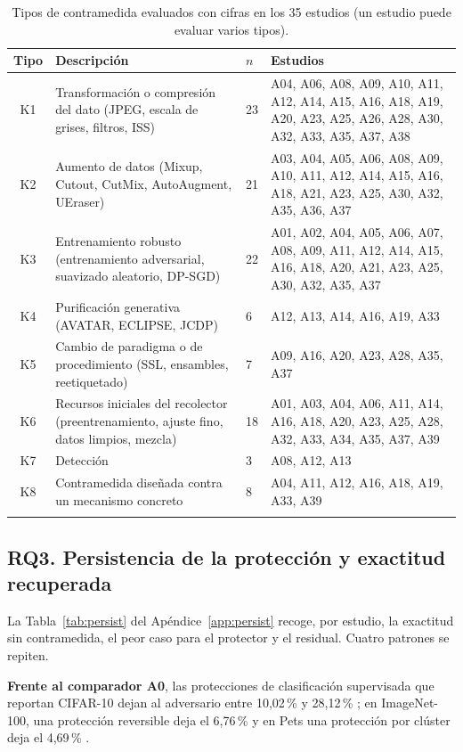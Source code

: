 \documentclass[pdflatex,sn-mathphys-num]{sn-jnl}
\theoremstyle{thmstyleone}
\theoremstyle{thmstyletwo}
\theoremstyle{thmstylethree}
\begin{document}
\begin{table}[h]
\centering
\caption{Tipos de contramedida evaluados con cifras en los 35 estudios (un estudio puede evaluar varios tipos).}\label{tab:rq2}
\footnotesize
\begin{tabularx}{\textwidth}{@{}cY{1.4}Z{0.25}Y{1.6}@{}}
\toprule
Tipo & Descripción & $n$ & Estudios \\
\midrule
K1 & Transformación o compresión del dato (JPEG, escala de grises, filtros, ISS) & 23 & A04, A06, A08, A09, A10, A11, A12, A14, A15, A16, A18, A19, A20, A23, A25, A26, A28, A30, A32, A33, A35, A37, A38 \\
K2 & Aumento de datos (Mixup, Cutout, CutMix, AutoAugment, UEraser) & 21 & A03, A04, A05, A06, A08, A09, A10, A11, A12, A14, A15, A16, A18, A21, A23, A25, A30, A32, A35, A36, A37 \\
K3 & Entrenamiento robusto (entrenamiento adversarial, suavizado aleatorio, DP-SGD) & 22 & A01, A02, A04, A05, A06, A07, A08, A09, A11, A12, A14, A15, A16, A18, A20, A21, A23, A25, A30, A32, A35, A37 \\
K4 & Purificación generativa (AVATAR, ECLIPSE, JCDP) & 6 & A12, A13, A14, A16, A19, A33 \\
K5 & Cambio de paradigma o de procedimiento (SSL, ensambles, reetiquetado) & 7 & A09, A16, A20, A23, A28, A35, A37 \\
K6 & Recursos iniciales del recolector (preentrenamiento, ajuste fino, datos limpios, mezcla) & 18 & A01, A03, A04, A06, A11, A14, A16, A18, A20, A23, A25, A28, A32, A33, A34, A35, A37, A39 \\
K7 & Detección & 3 & A08, A12, A13 \\
K8 & Contramedida diseñada contra un mecanismo concreto & 8 & A04, A11, A12, A16, A18, A19, A33, A39 \\
\botrule
\end{tabularx}
\end{table}

\subsection{RQ3. Persistencia de la protección y exactitud recuperada}

La Tabla~\ref{tab:persist} del Apéndice~\ref{app:persist} recoge, por estudio, la exactitud sin contramedida, el peor caso para el protector y el residual. Cuatro patrones se repiten.

\textbf{Frente al comparador A0}, las protecciones de clasificación supervisada que reportan CIFAR-10 dejan al adversario entre 10,02\,\% y 28,12\,\% \cite{ma2025t2ue,zhang2026provably}; en ImageNet-100, una protección reversible deja el 6,76\,\% \cite{wang2026reversible} y en Pets una protección por clúster deja el 4,69\,\% \cite{zhang2023clusters}.
\end{document}
